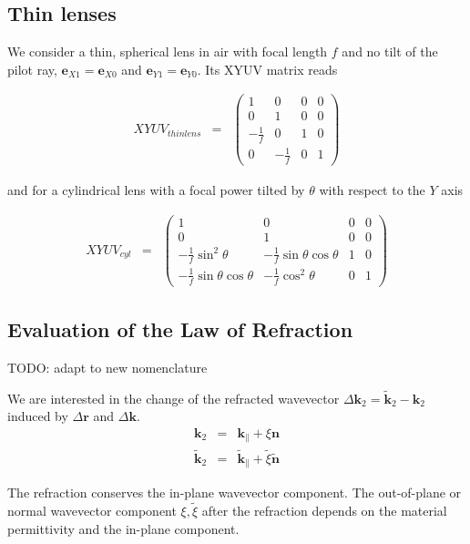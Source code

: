 \documentclass[12pt,a4paper,twoside,openright,BCOR10mm,headsepline,titlepage,abstracton,chapterprefix,final]{scrreprt}
\newcommand\Vector[1]{{\mathbf{#1}}}
\newcommand\wavenumber{k}
\newcommand\Wavevector{\Vector{\wavenumber}}
\begin{document}
\subsection{Thin lenses}
We consider a thin, spherical lens in air with focal length $f$ and no tilt of the pilot ray, 
$\Vector{e}_{X1} = \Vector{e}_{X0}$ and $\Vector{e}_{Y1} = \Vector{e}_{Y0}$. Its XYUV matrix reads

\begin{eqnarray}
XYUV_{thin lens} &=&
 \begin{pmatrix}
  1 & 0 & 0 & 0 \\
  0 & 1 & 0 & 0 \\
  -\frac{1}{f} & 0 & 1 & 0 \\
  0 & -\frac{1}{f} & 0 & 1
 \end{pmatrix}
\end{eqnarray}

and for a cylindrical lens with a focal power tilted by $\theta$ with respect to the $Y$ axis

\begin{eqnarray}
XYUV_{cyl} &=&
 \begin{pmatrix}
  1 & 0 & 0 & 0 \\
  0 & 1 & 0 & 0 \\
  -\frac{1}{f} \sin^2\theta & -\frac{1}{f} \sin\theta \cos\theta & 1 & 0 \\
  -\frac{1}{f} \sin\theta \cos\theta & -\frac{1}{f} \cos^2\theta & 0 & 1
 \end{pmatrix}
\end{eqnarray}



\subsection{Evaluation of the Law of Refraction}



TODO: adapt to new nomenclature

We are interested in the change of the refracted wavevector $\Delta\Wavevector_2 = \tilde{\Wavevector}_2 - \Wavevector_2$ induced by $\Delta\Vector{r}$ and $\Delta\Wavevector$.
\begin{eqnarray}
 \Wavevector_2 &=& \Wavevector_{\parallel} + \xi \Vector{n} 
 \\
 \tilde{\Wavevector}_2 &=& \tilde{\Wavevector}_{\parallel} + \tilde{\xi} \tilde{\Vector{n}} 
\end{eqnarray}

The refraction conserves the in-plane wavevector component. 
The out-of-plane or normal wavevector component $\xi, \tilde{\xi}$ after the refraction depends on the material permittivity and the in-plane component.
\end{document}
